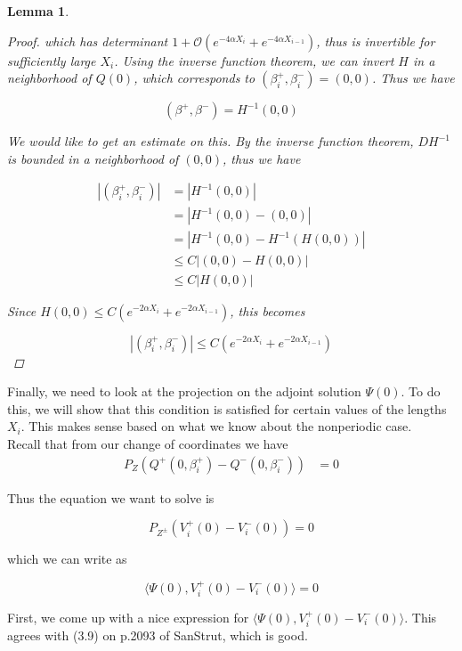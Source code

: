 \documentclass[12pt]{article}
\newtheorem{lemma}{Lemma}
\begin{document}
\begin{lemma}
\begin{proof}
which has determinant $1 + \mathcal{O}(e^{-4 \alpha X_i} + e^{-4 \alpha X_{i-1}})$, thus is invertible for sufficiently large $X_i$. Using the inverse function theorem, we can invert $H$ in a neighborhood of $Q(0)$, which corresponds to $(\beta_i^+, \beta_i^-) = (0, 0)$. Thus we have 

\[
(\beta^+, \beta^-) = H^{-1}(0, 0)
\]

We would like to get an estimate on this. By the inverse function theorem, $D H^{-1}$ is bounded in a neighborhood of $(0, 0)$, thus we have 

\begin{align*}
| (\beta_i^+, \beta_i^-) | &= | H^{-1}(0, 0) | \\
&= | H^{-1}(0, 0) - (0, 0) | \\
&= | H^{-1}(0, 0) - H^{-1}(H(0, 0)) | \\
& \leq C | (0, 0) - H(0, 0) | \\
& \leq C |H(0, 0)|
\end{align*}

Since $H(0, 0) \leq C (e^{-2 \alpha X_i} + e^{-2 \alpha X_{i-1}})$, this becomes

\[
| (\beta_i^+, \beta_i^-) | \leq C (e^{-2 \alpha X_i} + e^{-2 \alpha X_{i-1}})
\]

\end{proof}
\end{lemma}

Finally, we need to look at the projection on the adjoint solution $\Psi(0)$. To do this, we will show that this condition is satisfied for certain values of the lengths $X_i$. This makes sense based on what we know about the nonperiodic case.\\

Recall that from our change of coordinates we have
\begin{align*}
P_{Z}(Q^+(0, \beta_i^+) - Q^-(0, \beta_i^-)) &= 0
\end{align*}

Thus the equation we want to solve is

\begin{equation}
P_{Z^\pm}(V_i^+(0) - V_i^-(0)) = 0
\end{equation}

which we can write as

\begin{equation}
\langle \Psi(0), V_i^+(0) - V_i^-(0) \rangle = 0
\end{equation}

First, we come up with a nice expression for $\langle \Psi(0), V_i^+(0) - V_i^-(0) \rangle$. This agrees with (3.9) on p.2093 of SanStrut, which is good.
\end{document}
